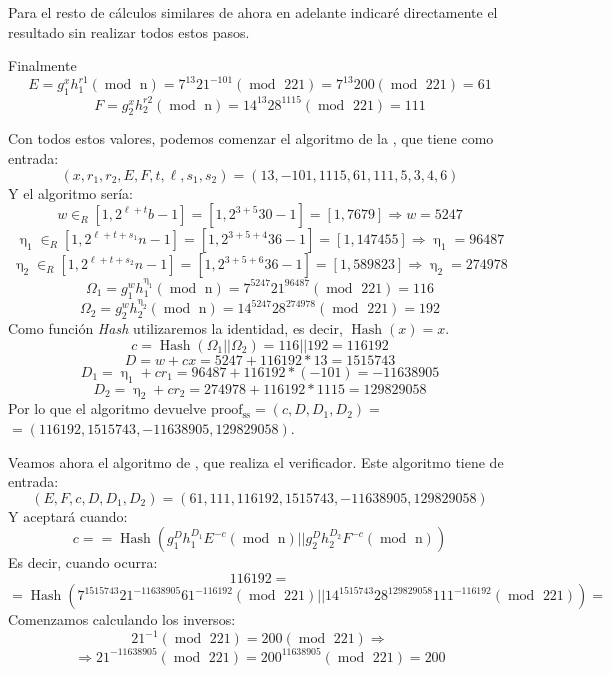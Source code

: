 Para el resto de cálculos similares de ahora en adelante indicaré directamente el resultado sin realizar todos estos pasos.

Finalmente
$$E = g_{1}^{x}h_{1}^{r{1}} (\operatorname{mod} \text{ n}) = 7^{13}21^{-101} (\operatorname{mod} \text{ 221}) = 7^{13}200 (\operatorname{mod} \text{ 221}) = 61$$
$$F = g_{2}^{x}h_{2}^{r{2}} (\operatorname{mod} \text{ n}) = 14^{13}28^{1115} (\operatorname{mod} \text{ 221}) = 111$$

Con todos estos valores, podemos comenzar el algoritmo de la , que tiene como entrada:
$$(x, r_{1}, r_{2}, E, F, t, \ell, s_{1}, s_{2}) = (13, -101, 1115, 61, 111, 5, 3, 4, 6)$$
Y el algoritmo sería:
$$w \in_{R} [1, 2^{\ell+t}b-1] = [1, 2^{3+5}30-1] = [1, 7679] \Rightarrow w = 5247$$
$$\upeta_{1} \in_{R} [1, 2^{\ell+t+s_{1}}n-1] = [1, 2^{3+5+4}36-1] = [1, 147455] \Rightarrow \upeta_{1} = 96487$$
$$\upeta_{2} \in_{R} [1, 2^{\ell+t+s_{2}}n-1] = [1, 2^{3+5+6}36-1] = [1, 589823] \Rightarrow \upeta_{2} = 274978$$
$$\Omega_{1} = g_{1}^{w}h_{1}^{\upeta_{1}} (\operatorname{mod} \text{ n}) = 7^{5247}21^{96487} (\operatorname{mod} \text{ 221}) = 116$$
$$\Omega_{2} = g_{2}^{w}h_{2}^{\upeta_{2}} (\operatorname{mod} \text{ n}) = 14^{5247}28^{274978} (\operatorname{mod} \text{ 221}) = 192$$
Como función \emph{Hash} utilizaremos la identidad, es decir, $\operatorname{Hash}(x) = x$.
$$c = \operatorname{Hash}(\Omega_{1}||\Omega_{2}) = 116 || 192 = 116192$$
$$D = w + cx = 5247 + 116192*13 = 1515743$$
$$D_{1} = \upeta_{1} + cr_{1} = 96487 + 116192*(-101) = -11638905$$
$$D_{2} = \upeta_{2} + cr_{2} = 274978 + 116192*1115 = 129829058$$
Por lo que el algoritmo devuelve $\operatorname{proof_{ss}} = (c, D, D_{1}, D_{2}) =$ \\ $= (116192, 1515743, -11638905, 129829058)$.

Veamos ahora el algoritmo de , que realiza el verificador. Este algoritmo tiene de entrada:
$$(E, F, c, D, D_{1}, D_{2}) = (61, 111, 116192, 1515743, -11638905, 129829058)$$
Y aceptará cuando:
$$c == \operatorname{Hash}(g_{1}^{D}h_{1}^{D_{1}}E^{-c} (\operatorname{mod} \text{ n})|| g_{2}^{D}h_{2}^{D_{2}}F^{-c} (\operatorname{mod} \text{ n}))$$
Es decir, cuando ocurra:
$$116192 = $$
$$ = \operatorname{Hash}(7^{1515743}21^{-11638905}61^{-116192} (\operatorname{mod} \text{ 221})|| 14^{1515743}28^{129829058}111^{-116192} (\operatorname{mod} \text{ 221})) = $$
Comenzamos calculando los inversos:
$$21^{-1} (\operatorname{mod} \text{ 221}) = 200 (\operatorname{mod} \text{ 221}) \Rightarrow$$ $$\Rightarrow 21^{-11638905} (\operatorname{mod} \text{ 221}) = 200^{11638905} (\operatorname{mod} \text{ 221}) = 200$$

